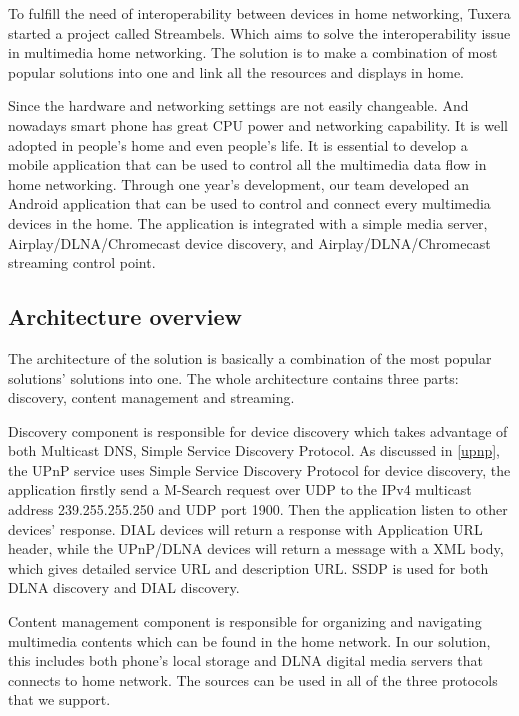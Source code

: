 
To fulfill the need of interoperability between devices in home networking,
Tuxera started a project called Streambels. Which aims to solve the
interoperability issue in multimedia home networking. The solution is to make a
combination of most popular solutions into one and link all the resources
and displays in home. 

Since the hardware and networking settings are not easily changeable. And
nowadays smart phone has great CPU power and networking capability. It is well
adopted in people's home and even people's life. It is essential to develop a
mobile application that can be used to control all the multimedia data flow in
home networking. Through one year's development, our team developed an Android
application that can be used to control and connect every multimedia devices in
the home. The application is integrated with a simple media server,
Airplay/DLNA/Chromecast device discovery, and Airplay/DLNA/Chromecast streaming
control point.

\subsection{Architecture overview}
The architecture of the solution is basically a combination of  the most popular
solutions' solutions into one. The whole architecture contains three parts:
discovery, content management and streaming. 

Discovery component is responsible for device discovery which takes advantage of
both Multicast DNS, Simple Service Discovery Protocol. As discussed in
\ref{upnp}, the UPnP service uses Simple Service Discovery Protocol for device
discovery, the application firstly send a M-Search request over UDP to the
IPv4 multicast address 239.255.255.250 and UDP port 1900. Then the application
listen to other devices' response. DIAL devices will return a response with
Application URL header, while the UPnP/DLNA devices will return a message with
a XML body, which gives detailed service URL and description URL. SSDP is used
for both DLNA discovery and DIAL discovery. 

Content management component is responsible for organizing and
navigating multimedia contents which can be found in the home network. In our
solution, this includes both phone's local storage and DLNA digital media
servers that connects to home network. The sources can be used in all of the
three protocols that we support.

